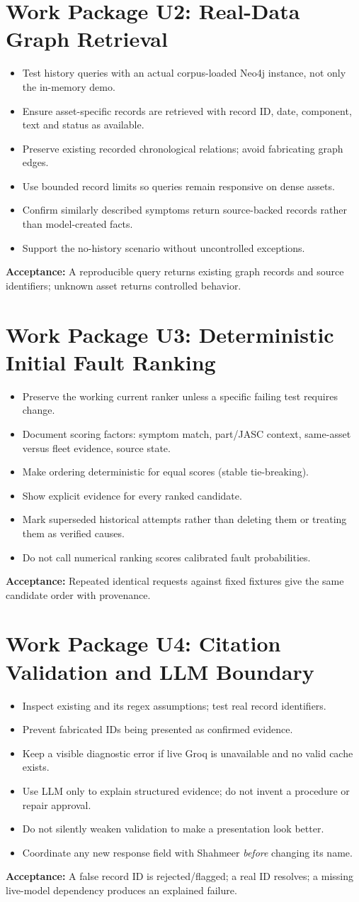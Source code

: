 \documentclass[11pt,a4paper,oneside]{report}
\newcommand{\task}[1]{\item[$\square$] #1}
\newcommand{\file}[1]{\path{#1}}
\begin{document}
\section{Work Package U2: Real-Data Graph Retrieval}
\begin{itemize}
\task{Test history queries with an actual corpus-loaded Neo4j instance, not only the in-memory demo.}
\task{Ensure asset-specific records are retrieved with record ID, date, component, text and status as available.}
\task{Preserve existing recorded chronological relations; avoid fabricating graph edges.}
\task{Use bounded record limits so queries remain responsive on dense assets.}
\task{Confirm similarly described symptoms return source-backed records rather than model-created facts.}
\task{Support the no-history scenario without uncontrolled exceptions.}
\end{itemize}
\textbf{Acceptance:} A reproducible query returns existing graph records and source identifiers; unknown asset returns controlled behavior.

\section{Work Package U3: Deterministic Initial Fault Ranking}
\begin{itemize}
\task{Preserve the working current ranker unless a specific failing test requires change.}
\task{Document scoring factors: symptom match, part/JASC context, same-asset versus fleet evidence, source state.}
\task{Make ordering deterministic for equal scores (stable tie-breaking).}
\task{Show explicit evidence for every ranked candidate.}
\task{Mark superseded historical attempts rather than deleting them or treating them as verified causes.}
\task{Do not call numerical ranking scores calibrated fault probabilities.}
\end{itemize}
\textbf{Acceptance:} Repeated identical requests against fixed fixtures give the same candidate order with provenance.

\section{Work Package U4: Citation Validation and LLM Boundary}
\begin{itemize}
\task{Inspect existing \file{_validate_citations} and its regex assumptions; test real record identifiers.}
\task{Prevent fabricated IDs being presented as confirmed evidence.}
\task{Keep a visible diagnostic error if live Groq is unavailable and no valid cache exists.}
\task{Use LLM only to explain structured evidence; do not invent a procedure or repair approval.}
\task{Do not silently weaken validation to make a presentation look better.}
\task{Coordinate any new response field with Shahmeer \emph{before} changing its name.}
\end{itemize}
\textbf{Acceptance:} A false record ID is rejected/flagged; a real ID resolves; a missing live-model dependency produces an explained failure.
\end{document}
